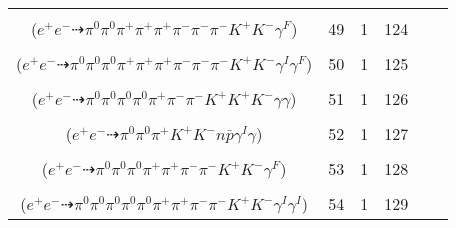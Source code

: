 \documentclass[landscape]{article}
\newcounter{rownumbers}
\newcommand\rn{\stepcounter{rownumbers}\arabic{rownumbers}}
\newcommand{\EOL}{\\} %
\newcommand{\topoTags}[1]{#1} %
\begin{document}
\begin{longtable}{clcccc}
\rn & \makecell[l]{ $ 
e^{+} e^{-} \rightarrow \pi^{0} \rho^{0} \pi^{+} \pi^{-} \rho^{+} K^{*} K^{-} ,
\rho^{0} \rightarrow \pi^{+} \pi^{-} \gamma^{F} ,
\rho^{+} \rightarrow \pi^{0} \pi^{+} ,
K^{*} \rightarrow \pi^{-} K^{+} 
$ \\ ($
e^{+} e^{-} \dashrightarrow \pi^{0} \pi^{0} \pi^{+} \pi^{+} \pi^{+} \pi^{-} \pi^{-} \pi^{-} K^{+} K^{-} \gamma^{F} 
$) } & \topoTags{49 & }1 & 124 \EOL

\rn & \makecell[l]{ $ 
e^{+} e^{-} \rightarrow \pi^{0} \rho^{0} \pi^{+} \pi^{-} \rho^{+} \rho^{-} K^{+} K^{-} \gamma^{I} ,
\rho^{0} \rightarrow \pi^{+} \pi^{-} \gamma^{F} ,
\rho^{+} \rightarrow \pi^{0} \pi^{+} ,
\rho^{-} \rightarrow \pi^{0} \pi^{-} 
$ \\ ($
e^{+} e^{-} \dashrightarrow \pi^{0} \pi^{0} \pi^{0} \pi^{+} \pi^{+} \pi^{+} \pi^{-} \pi^{-} \pi^{-} K^{+} K^{-} \gamma^{I} \gamma^{F} 
$) } & \topoTags{50 & }1 & 125 \EOL

\rn & \makecell[l]{ $ 
e^{+} e^{-} \rightarrow \pi^{+} \pi^{-} \pi^{-} \eta \bar{K}^{*} K^{+} \phi ,
\eta \rightarrow \gamma \gamma ,
\bar{K}^{*} \rightarrow \pi^{0} \bar{K}^{0} ,
\phi \rightarrow K^{+} K^{-} ,
\bar{K}^{0} \rightarrow K_{L}^{0} ,
K_{L}^{0} \rightarrow \pi^{0} \pi^{0} \pi^{0} 
$ \\ ($
e^{+} e^{-} \dashrightarrow \pi^{0} \pi^{0} \pi^{0} \pi^{0} \pi^{+} \pi^{-} \pi^{-} K^{+} K^{+} K^{-} \gamma \gamma 
$) } & \topoTags{51 & }1 & 126 \EOL

\rn & \makecell[l]{ $ 
e^{+} e^{-} \rightarrow \pi^{0} \pi^{+} \omega K^{+} K^{-} n \bar{p} \gamma^{I} ,
\omega \rightarrow \pi^{0} \gamma 
$ \\ ($
e^{+} e^{-} \dashrightarrow \pi^{0} \pi^{0} \pi^{+} K^{+} K^{-} n \bar{p} \gamma^{I} \gamma 
$) } & \topoTags{52 & }1 & 127 \EOL

\rn & \makecell[l]{ $ 
e^{+} e^{-} \rightarrow \pi^{0} \pi^{0} \rho^{0} \rho^{-} \bar{K}^{*} K^{+} ,
\rho^{0} \rightarrow \pi^{+} \pi^{-} \gamma^{F} ,
\rho^{-} \rightarrow \pi^{0} \pi^{-} ,
\bar{K}^{*} \rightarrow \pi^{+} K^{-} 
$ \\ ($
e^{+} e^{-} \dashrightarrow \pi^{0} \pi^{0} \pi^{0} \pi^{+} \pi^{+} \pi^{-} \pi^{-} K^{+} K^{-} \gamma^{F} 
$) } & \topoTags{53 & }1 & 128 \EOL

\rn & \makecell[l]{ $ 
e^{+} e^{-} \rightarrow \pi^{0} \pi^{0} \pi^{+} \rho^{+} \rho^{-} \rho^{-} K^{+} K^{-} \gamma^{I} \gamma^{I} ,
\rho^{+} \rightarrow \pi^{0} \pi^{+} ,
\rho^{-} \rightarrow \pi^{0} \pi^{-} ,
\rho^{-} \rightarrow \pi^{0} \pi^{-} 
$ \\ ($
e^{+} e^{-} \dashrightarrow \pi^{0} \pi^{0} \pi^{0} \pi^{0} \pi^{0} \pi^{+} \pi^{+} \pi^{-} \pi^{-} K^{+} K^{-} \gamma^{I} \gamma^{I} 
$) } & \topoTags{54 & }1 & 129 \EOL


\end{longtable}
\end{document}
